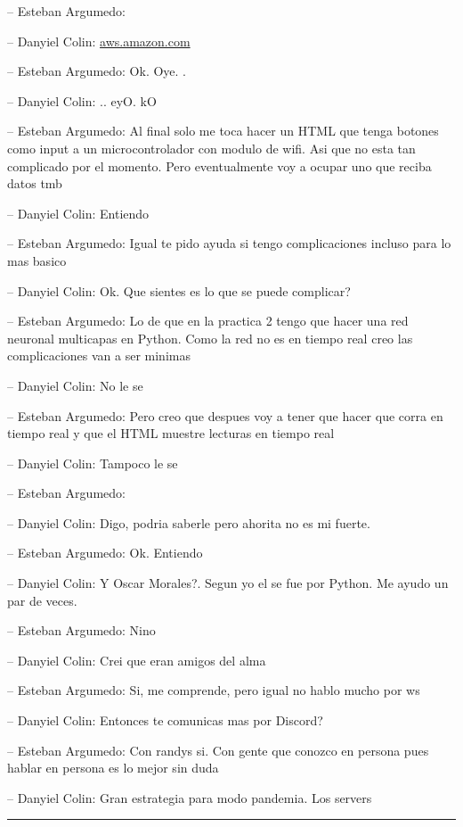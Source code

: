-- Esteban Argumedo:

-- Danyiel Colin:
\href{https://aws.amazon.com/blogs/opensource/sustainability-with-rust/}{aws.amazon.com}

-- Esteban Argumedo: Ok. Oye. .

-- Danyiel Colin: .. eyO. kO

-- Esteban Argumedo: Al final solo me toca hacer un HTML que tenga
botones como input a un microcontrolador con modulo de wifi. Asi que no
esta tan complicado por el momento. Pero eventualmente voy a ocupar uno
que reciba datos tmb

-- Danyiel Colin: Entiendo

-- Esteban Argumedo: Igual te pido ayuda si tengo complicaciones incluso
para lo mas basico

-- Danyiel Colin: Ok. Que sientes es lo que se puede complicar?

-- Esteban Argumedo: Lo de que en la practica 2 tengo que hacer una red
neuronal multicapas en Python. Como la red no es en tiempo real creo las
complicaciones van a ser minimas

-- Danyiel Colin: No le se

-- Esteban Argumedo: Pero creo que despues voy a tener que hacer que
corra en tiempo real y que el HTML muestre lecturas en tiempo real

-- Danyiel Colin: Tampoco le se

-- Esteban Argumedo:

-- Danyiel Colin: Digo, podria saberle pero ahorita no es mi fuerte.

-- Esteban Argumedo: Ok. Entiendo

-- Danyiel Colin: Y Oscar Morales?. Segun yo el se fue por Python. Me
ayudo un par de veces.

-- Esteban Argumedo: Nino

-- Danyiel Colin: Crei que eran amigos del alma

-- Esteban Argumedo: Si, me comprende, pero igual no hablo mucho por ws

-- Danyiel Colin: Entonces te comunicas mas por Discord?

-- Esteban Argumedo: Con randys si. Con gente que conozco en persona
pues hablar en persona es lo mejor sin duda

-- Danyiel Colin: Gran estrategia para modo pandemia. Los servers

\begin{center}\rule{0.5\linewidth}{0.5pt}\end{center}

